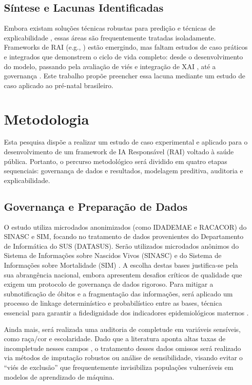 \documentclass[12pt]{article}
\begin{document}
\subsection{Síntese e Lacunas Identificadas}
Embora existam soluções técnicas robustas para predição \cite{MachineLearning2022, Cetin2020} e técnicas de explicabilidade \cite{Advancing2025}, essas áreas são frequentemente tratadas isoladamente. Frameworks de RAI (e.g., \cite{Lekadir2022}) estão emergindo, mas faltam estudos de caso práticos e integrados que demonstrem o ciclo de vida completo: desde o desenvolvimento do modelo, passando pela avaliação de viés \cite{FairnessAI2023} e integração de XAI \cite{ExplainableAI2023}, até a governança \cite{AIGovernance2025}. Este trabalho propõe preencher essa lacuna mediante um estudo de caso aplicado ao pré-natal brasileiro.

\section{Metodologia}
Esta pesquisa dispõe a realizar um estudo de caso experimental e aplicado para o desenvolvimento de um framework de IA Responsável (RAI) voltado à saúde pública. Portanto, o percurso metodológico será dividido em quatro etapas sequenciais: governança de dados e resultados, modelagem preditiva, auditoria e explicabilidade.

\subsection{Governança e Preparação de Dados}
O estudo utiliza microdados anonimizados (como IDADEMAE e RACACOR) do SINASC e SIM, focando no tratamento de dados provenientes do Departamento de Informática do SUS (DATASUS). Serão utilizados microdados anônimos do Sistema de Informações sobre Nascidos Vivos (SINASC) e do Sistema de Informações sobre Mortalidade (SIM) \cite{ThemeFilha2014}. A escolha destas bases justifica-se pela sua abrangência nacional, embora apresentem desafios críticos de qualidade que exigem um protocolo de governança de dados rigoroso. Para mitigar a subnotificação de óbitos e a fragmentação das informações, será aplicado um processo de linkage determinístico e probabilístico entre as bases, técnica essencial para garantir a fidedignidade dos indicadores epidemiológicos maternos \cite{Carvalho2019, Silva2006}.

Ainda mais, será realizada uma auditoria de completude em variáveis sensíveis, como raça/cor e escolaridade. Dado que a literatura aponta altas taxas de incompletude nesses campos \cite{ThemeFilha2012, Santos2021}, o tratamento desses dados omissos será realizado via métodos de imputação robustos ou análise de sensibilidade, visando evitar o “viés de exclusão” que frequentemente invisibiliza populações vulneráveis em modelos de aprendizado de máquina.
\end{document}
